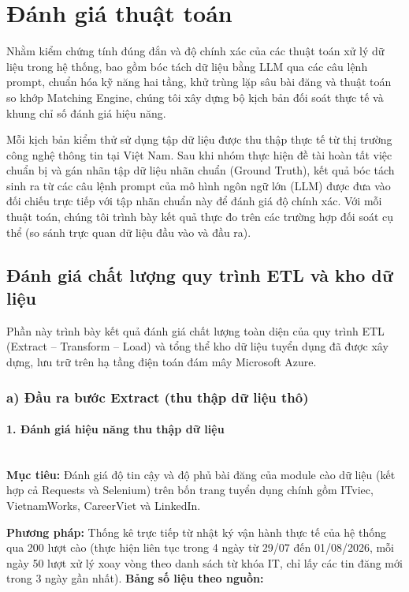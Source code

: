 \section{Đánh giá thuật toán}
\label{sec:algorithm_evaluation}

Nhằm kiểm chứng tính đúng đắn và độ chính xác của các thuật toán xử lý dữ liệu trong hệ thống, bao gồm bóc tách dữ liệu bằng LLM qua các câu lệnh prompt, chuẩn hóa kỹ năng hai tầng, khử trùng lặp sâu bài đăng và thuật toán so khớp Matching Engine, chúng tôi xây dựng bộ kịch bản đối soát thực tế và khung chỉ số đánh giá hiệu năng.

Mỗi kịch bản kiểm thử sử dụng tập dữ liệu được thu thập thực tế từ thị trường công nghệ thông tin tại Việt Nam. Sau khi nhóm thực hiện đề tài hoàn tất việc chuẩn bị và gán nhãn tập dữ liệu nhãn chuẩn (Ground Truth), kết quả bóc tách sinh ra từ các câu lệnh prompt của mô hình ngôn ngữ lớn (LLM) được đưa vào đối chiếu trực tiếp với tập nhãn chuẩn này để đánh giá độ chính xác. Với mỗi thuật toán, chúng tôi trình bày kết quả thực đo trên các trường hợp đối soát cụ thể (so sánh trực quan dữ liệu đầu vào và đầu ra).
\subsection{Đánh giá chất lượng quy trình ETL và kho dữ liệu}
\label{subsec:etl_evaluation}

Phần này trình bày kết quả đánh giá chất lượng toàn diện của quy trình ETL (Extract -- Transform -- Load) và tổng thể kho dữ liệu tuyển dụng đã được xây dựng, lưu trữ trên hạ tầng điện toán đám mây Microsoft Azure.

\subsubsection*{a) Đầu ra bước Extract (thu thập dữ liệu thô)}
\label{subsubsec:etl_extract}

\paragraph*{1. Đánh giá hiệu năng thu thập dữ liệu}
\mbox{}\\[2pt]
\textbf{Mục tiêu:} Đánh giá độ tin cậy và độ phủ bài đăng của module cào dữ liệu (kết hợp cả Requests và Selenium) trên bốn trang tuyển dụng chính gồm ITviec, VietnamWorks, CareerViet và LinkedIn.

\textbf{Phương pháp:} Thống kê trực tiếp từ nhật ký vận hành thực tế của hệ thống qua 200 lượt cào (thực hiện liên tục trong 4 ngày từ 29/07 đến 01/08/2026, mỗi ngày 50 lượt xử lý xoay vòng theo danh sách từ khóa IT, chỉ lấy các tin đăng mới trong 3 ngày gần nhất).
\textbf{Bảng số liệu theo nguồn:}

